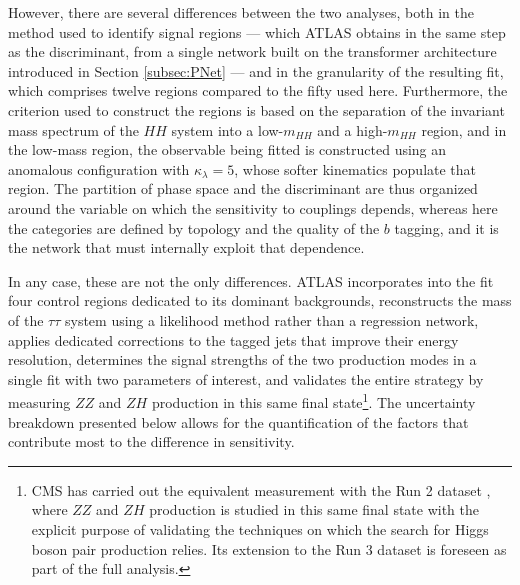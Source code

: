 However, there are several differences between the two analyses, both in the method used to identify signal regions — which ATLAS obtains in the same step as the discriminant, from a single network built on the transformer architecture introduced in Section \ref{subsec:PNet} — and in the granularity of the resulting fit, which comprises twelve regions compared to the fifty used here. Furthermore, the criterion used to construct the regions is based on the separation of the invariant mass spectrum of the $HH$ system into a low-$m_{HH}$ and a high-$m_{HH}$ region, and in the low-mass region, the observable being fitted is constructed using an anomalous configuration with $\kappa_\lambda = 5$, whose softer kinematics populate that region. The partition of phase space and the discriminant are thus organized around the variable on which the sensitivity to couplings depends, whereas here the categories are defined by topology and the quality of the $b$ tagging, and it is the network that must internally exploit that dependence.

In any case, these are not the only differences. ATLAS incorporates into the fit four control regions dedicated to its dominant backgrounds, reconstructs the mass of the $\tau\tau$ system using a likelihood method rather than a regression network, applies dedicated corrections to the tagged jets that improve their energy resolution, determines the signal strengths of the two production modes in a single fit with two parameters of interest, and validates the entire strategy by measuring $ZZ$ and $ZH$ production in this same final state\footnote{CMS has carried out the equivalent measurement with the Run 2 dataset \cite{CMS:2026zzzh}, where $ZZ$ and $ZH$ production is studied in this same final state with the explicit purpose of validating the techniques on which the search for Higgs boson pair production relies. Its extension to the Run 3 dataset is foreseen as part of the full analysis.}. The uncertainty breakdown presented below allows for the quantification of the factors that contribute most to the difference in sensitivity.\medskip



